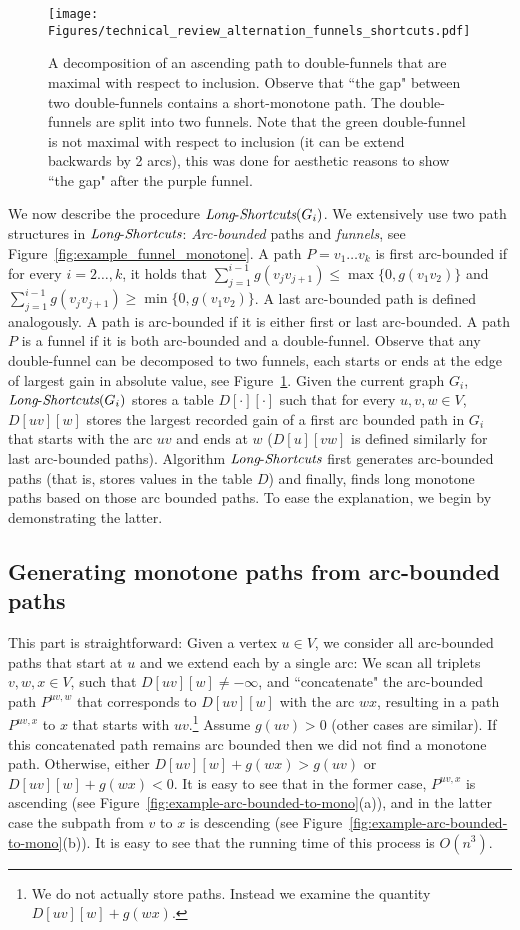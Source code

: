 \documentclass[11pt]{article}
\newcommand{\LS}{\mbox{{\it Long}-{\it Shortcuts}}}
\begin{document}
\begin{figure}
    \centering
    \texttt{[image: Figures/technical\_review\_alternation\_funnels\_shortcuts.pdf]}
    \caption{A decomposition of an ascending path to double-funnels that are maximal with respect to inclusion. Observe that ``the gap" between two double-funnels contains a short-monotone path. The double-funnels are split into two funnels. Note that the green double-funnel is not maximal with respect to inclusion (it can be extend backwards by 2 arcs), this was done for aesthetic reasons to show ``the gap" after the purple funnel.}
    \label{fig:alternation-funnel-shortcut}
\end{figure}

We now describe the procedure $\LS(G_i)$. We extensively use two path structures in $\LS$:  \emph{Arc-bounded} paths and \emph{funnels}, see Figure~\ref{fig:example_funnel_monotone}. A path $P = v_1\ldots v_k$ is first arc-bounded  if for every $i = 2\ldots, k$, it holds that $ \sum_{j=1}^{i-1}g(v_j v_{j+1}) \le \max \{0, g(v_1 v_2) \}$ and $ \sum_{j=1}^{i-1}g(v_j v_{j+1}) \ge \min \{0, g(v_1 v_2) \}$. 
A last arc-bounded path is defined analogously. A path is arc-bounded if it is either first or last arc-bounded. A path $P$ is a funnel if it is both arc-bounded and a double-funnel. 
Observe that any double-funnel can be decomposed to two funnels, each starts or ends at the edge of largest gain in absolute value, see Figure~\ref{fig:alternation-funnel-shortcut}.
Given the current graph $G_i$, $\LS(G_i)$ stores a table $D[\cdot][\cdot]$ such that for every $u,v,w\in V$, $D[uv][w]$ stores the largest recorded gain of a first arc bounded path in $G_i$ that starts with the arc $uv$ and ends at $w$ ($D[u][vw]$ is defined similarly for last arc-bounded paths). Algorithm $\LS$ first generates arc-bounded paths (that is, stores values in the table $D$) and finally, finds long monotone paths based on those arc bounded paths. To ease the explanation, we begin by demonstrating the latter. 

\subsection{Generating monotone paths from arc-bounded paths}\label{sec:arc-bounded-to-mono-review}
This part is straightforward: Given a vertex $u\in V$, we consider all arc-bounded paths that start at $u$ and we extend each by a single arc: We scan all triplets $v,w,x\in V$, such that $D[uv][w] \neq -\infty$, and ``concatenate" the arc-bounded path $P^{uv,w}$ that corresponds to $D[uv][w]$ with the arc $wx$, resulting in a path $P^{uv,x}$ to $x$ that starts with $uv$.\footnote{We do not actually store paths. Instead we examine the quantity $D[uv][w]+g(wx)$.} Assume $g(uv)>0$ (other cases are similar). If this concatenated path  remains arc bounded then we did not find a monotone path. Otherwise, either $D[uv][w]+g(wx) > g(uv)$ or $D[uv][w]+g(wx) < 0$. It is easy to see that in the former case, $P^{uv,x}$ is ascending (see Figure~\ref{fig:example-arc-bounded-to-mono}(a)), and in the latter case the subpath from $v$ to $x$ is descending (see Figure~\ref{fig:example-arc-bounded-to-mono}(b)). It is easy to see that the running time of this process is $O(n^3)$. 
\end{document}
